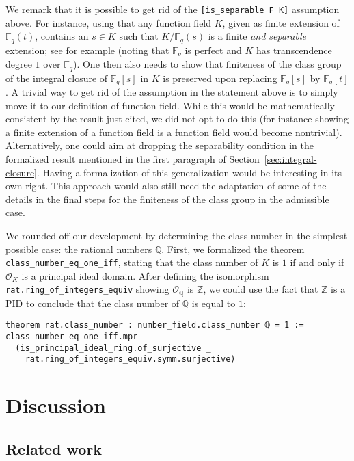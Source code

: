 \documentclass[sn-mathphys]{sn-jnl}%
\newcommand{\lean}[1]{\texttt{#1}\xspace}
\newcommand*{\OK}[1][K]{\mathcal{O}_{#1}}
\newcommand*{\Fq}[1][q]{\mathbb{F}_{#1}}
\newcommand{\QQ}{\mathbb{Q}}
\renewcommand{\Z}{\mathbb{Z}}
\begin{document}
We remark that it is possible to get rid of the \lean{[is\_separable F K]} assumption above. 
For instance, using that any function field $K$, given as finite extension of $\Fq[q](t)$, contains an $s \in K$ such that $K/\Fq[q](s)$ is a finite \emph{and separable} extension; see for example \cite[Corollary 4.4 in Chapter VIII]{Lang} (noting that $\Fq$ is perfect and $K$ has transcendence degree $1$ over $\Fq$).
One then also needs to show that finiteness of the class group of the integral closure of $\Fq[q][s]$ in $K$ is preserved upon replacing $\Fq[q][s]$ by $\Fq[q][t]$.
A trivial way to get rid of the assumption in the statement above is to simply move it to our definition of function field.
While this would be mathematically consistent by the result just cited, we did not opt to do this (for instance showing a finite extension of a function field is a function field
would become nontrivial).
Alternatively, one could aim at dropping the separability condition in the formalized result mentioned in the first paragraph of Section~\ref{sec:integral-closure}.
Having a formalization of this generalization would be interesting in its own right.
This approach would also still need the adaptation of some of the details in the final steps for the finiteness of the class group in the admissible case.

We rounded off our development by determining the class number in the simplest possible case: the rational numbers $\QQ$.
First, we formalized the theorem \lean{class\_number\_eq\_one\_iff}, stating that the class number of $K$ is $1$ if and only if $\OK$ is a principal ideal domain.
After defining the isomorphism \lean{rat.ring\_of\_integers\_equiv} showing $\OK[\QQ]$ is $\Z$,
we could use the fact that $\Z$ is a PID to conclude that the class number of $\QQ$ is equal to $1$:
\begin{lstlisting}
theorem rat.class_number : number_field.class_number ℚ = 1 :=
class_number_eq_one_iff.mpr
  (is_principal_ideal_ring.of_surjective _
    rat.ring_of_integers_equiv.symm.surjective)
\end{lstlisting}

\section{Discussion}

\subsection{Related work}
\end{document}
